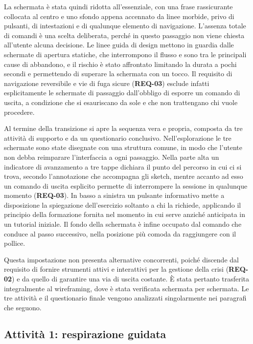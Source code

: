 La schermata è stata quindi ridotta all'essenziale, con una frase rassicurante collocata al centro e uno sfondo appena accennato da linee morbide, privo di pulsanti, di intestazioni e di qualunque elemento di navigazione.
L'assenza totale di comandi è una scelta deliberata, perché in questo passaggio non viene chiesta all'utente alcuna decisione.
Le linee guida di design mettono in guardia dalle schermate di apertura statiche, che interrompono il flusso e sono tra le principali cause di abbandono, e il rischio è stato affrontato limitando la durata a pochi secondi e permettendo di superare la schermata con un tocco.
Il requisito di navigazione reversibile e vie di fuga sicure (\textbf{REQ-03}) esclude infatti esplicitamente le schermate di passaggio dall'obbligo di esporre un comando di uscita, a condizione che si esauriscano da sole e che non trattengano chi vuole procedere.

Al termine della transizione si apre la sequenza vera e propria, composta da tre attività di supporto e da un questionario conclusivo.
Nell'esplorazione le tre schermate sono state disegnate con una struttura comune, in modo che l'utente non debba reimparare l'interfaccia a ogni passaggio.
Nella parte alta un indicatore di avanzamento a tre tappe dichiara il punto del percorso in cui ci si trova, secondo l'annotazione che accompagna gli sketch, mentre accanto ad esso un comando di uscita esplicito permette di interrompere la sessione in qualunque momento (\textbf{REQ-03}).
In basso a sinistra un pulsante informativo mette a disposizione la spiegazione dell'esercizio soltanto a chi la richiede, applicando il principio della formazione fornita nel momento in cui serve anziché anticipata in un tutorial iniziale.
Il fondo della schermata è infine occupato dal comando che conduce al passo successivo, nella posizione più comoda da raggiungere con il pollice.

Questa impostazione non presenta alternative concorrenti, poiché discende dal requisito di fornire strumenti attivi e interattivi per la gestione della crisi (\textbf{REQ-02}) e da quello di garantire una via di uscita costante.
È stata pertanto trasferita integralmente al wireframing, dove è stata verificata schermata per schermata.
Le tre attività e il questionario finale vengono analizzati singolarmente nei paragrafi che seguono.

\subsection{Attività 1: respirazione guidata}
\label{subsec:sketch-respirazione}

